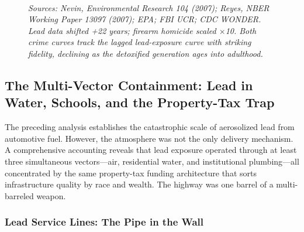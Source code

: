 \documentclass[
]{article}
\newcounter{none} %
\begin{document}
\begin{figure}[ht]
\\[0.4em]
\parbox{\linewidth}{\raggedright\small\emph{Sources: Nevin, Environmental Research 104 (2007); Reyes, NBER Working Paper 13097 (2007); EPA; FBI UCR; CDC WONDER. Lead data shifted +22 years; firearm homicide scaled $\times$10. Both crime curves track the lagged lead-exposure curve with striking fidelity, declining as the detoxified generation ages into adulthood.}}
\end{figure}

\subsection{\texorpdfstring{\textbf{The Multi-Vector Containment: Lead
in Water, Schools, and the Property-Tax
Trap}}{The Multi-Vector Containment: Lead in Water, Schools, and the Property-Tax Trap}}\label{the-multi-vector-containment-lead-in-water-schools-and-the-property-tax-trap}

The preceding analysis establishes the catastrophic scale of aerosolized
lead from automotive fuel. However, the atmosphere was not the only
delivery mechanism. A comprehensive accounting reveals that lead
exposure operated through at least three simultaneous vectors---air,
residential water, and institutional plumbing---all concentrated by the
same property-tax funding architecture that sorts infrastructure quality
by race and wealth. The highway was one barrel of a multi-barreled
weapon.

\subsubsection{\texorpdfstring{\textbf{Lead Service Lines: The Pipe in
the Wall}}{Lead Service Lines: The Pipe in the Wall}}\label{lead-service-lines-the-pipe-in-the-wall}
\end{document}
